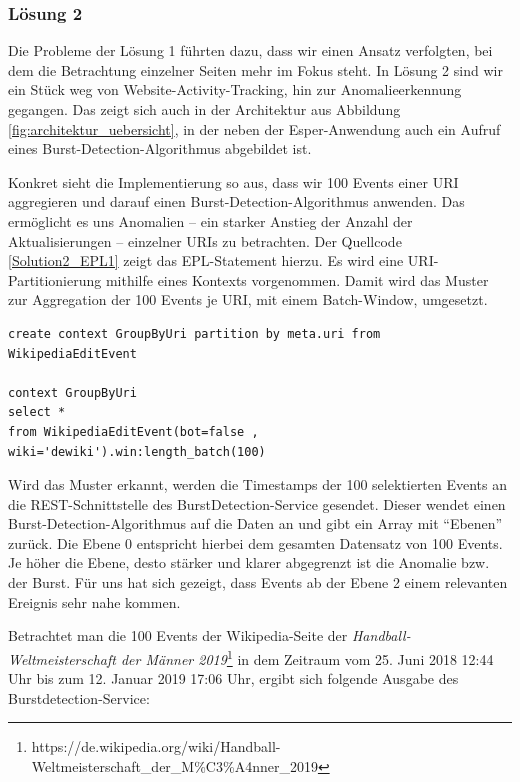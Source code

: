 \subsubsection{Lösung 2}
Die Probleme der Lösung 1 führten dazu, dass wir einen Ansatz verfolgten, bei dem die Betrachtung einzelner Seiten mehr im Fokus steht.
In Lösung 2 sind wir ein Stück weg von Website-Activity-Tracking, hin zur Anomalieerkennung gegangen. Das zeigt sich auch in der
Architektur aus Abbildung \ref{fig:architektur_uebersicht}, in der neben der Esper-Anwendung auch ein Aufruf eines
Burst-Detection-Algorithmus abgebildet ist.

Konkret sieht die Implementierung so aus, dass wir 100 Events einer URI aggregieren und darauf einen Burst-Detection-Algorithmus anwenden.
Das ermöglicht es uns Anomalien -- ein starker Anstieg der Anzahl der Aktualisierungen -- einzelner URIs zu betrachten.
Der Quellcode \ref{Solution2_EPL1} zeigt das EPL-Statement hierzu. Es wird eine URI-Partitionierung mithilfe eines
Kontexts vorgenommen. Damit wird das Muster zur Aggregation der 100 Events je URI, mit einem Batch-Window, umgesetzt.

\begin{lstlisting}[label=Solution2_EPL1,caption=Lösung 2: EPL-Statement,language=epl,firstnumber=1,captionpos=b]
create context GroupByUri partition by meta.uri from WikipediaEditEvent

context GroupByUri
select *
from WikipediaEditEvent(bot=false , wiki='dewiki').win:length_batch(100)
\end{lstlisting}

Wird das Muster erkannt, werden die Timestamps der 100 selektierten Events an die REST-Schnittstelle des BurstDetection-Service gesendet.
Dieser wendet einen Burst-Detection-Algorithmus auf die Daten an und gibt ein Array mit \textquotedblleft{}Ebenen\textquotedblright{} zurück.
Die Ebene 0 entspricht hierbei dem gesamten Datensatz von 100 Events. Je höher die Ebene, desto stärker und klarer abgegrenzt ist die
Anomalie bzw. der Burst. Für uns hat sich gezeigt, dass Events ab der Ebene 2 einem relevanten Ereignis sehr nahe kommen.

Betrachtet man die 100 Events der Wikipedia-Seite der \textit{Handball-Weltmeisterschaft der Männer 2019}\footnote{https://de.wikipedia.org/wiki/Handball-Weltmeisterschaft\newline{}\_der\_M\%C3\%A4nner\_2019}
in dem Zeitraum vom 25. Juni 2018 12:44 Uhr bis zum 12. Januar 2019 17:06 Uhr, ergibt sich folgende Ausgabe des Burstdetection-Service:

